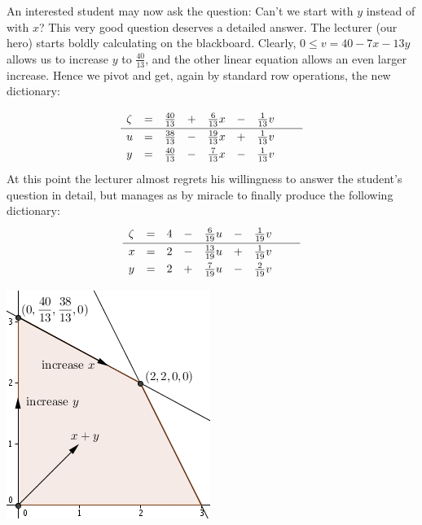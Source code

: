 \documentclass[ukenglish]{nik}
\begin{document}
An interested student may now ask the question: 
Can't we start with $y$ instead of with $x$?
This very good question deserves a detailed answer.
The lecturer (our hero) starts boldly calculating on the blackboard.
Clearly, $0\leq v = 40 - 7x -13y$ allows us to increase $y$ to $\frac{40}{13}$,
and the other linear equation allows an even larger increase. Hence we pivot and get,
again by standard row operations, the new dictionary:
\begin{minipage}{.63\textwidth}
\[    
    \begin{array}{lcrcrcrcr}
      \zeta&=& \frac{40}{13} &+& \frac{6}{13} x &-& \frac{1}{13} v &\vphantom{\frac{|}{|}} &  \\\hline
      u    &=& \frac{38}{13} &-&\frac{19}{13} x &+& \frac{1}{13} v &\vphantom{\frac{|}{|}} &  \\
      y    &=& \frac{40}{13} &-& \frac{7}{13} x &-& \frac{1}{13} v &\vphantom{\frac{|}{|}} &  \\
    \end{array}
\]
At this point the lecturer almost regrets his willingness to answer the student's
question in detail, but manages as by miracle to finally produce the following dictionary:
\[    
    \begin{array}{lcrcrcrcr}
      \zeta&=& 4 &-& \frac{6}{19} u &-& \frac{1}{19} v &\vphantom{\frac{|}{|}} &  \\\hline
      x    &=& 2 &-&\frac{13}{19} u &+& \frac{1}{19} v &\vphantom{\frac{|}{|}} &  \\
      y    &=& 2 &+& \frac{7}{19} u &-& \frac{2}{19} v &\vphantom{\frac{|}{|}} &  \\
    \end{array}
\]
\end{minipage}
	\begin{minipage}{.32\textwidth}
				\includegraphics{ex4.jpg}
\end{minipage}
\vspace{.2cm}
\end{document}
